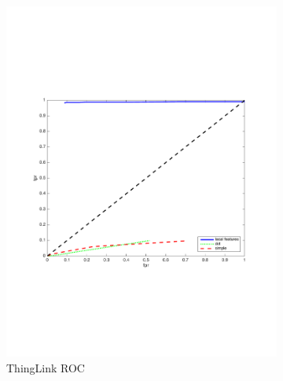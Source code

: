 \documentclass[english,12pt,a4paper,pdftex,elec,utf8, table]{aaltothesis}
\begin{document}
\begin{figure}[htb]
\begin{center}
\begin{subfigure}[b]{0.49\textwidth}
    \includegraphics[width=\textwidth]{figures/thinglink_Rotate10ROC.pdf}
    \caption{ThingLink ROC}
    \label{Rotatepr}
  \end{subfigure}
  \begin{subfigure}[b]{0.49\textwidth}

\end{subfigure}
\end{center}
\end{figure}
\end{document}
